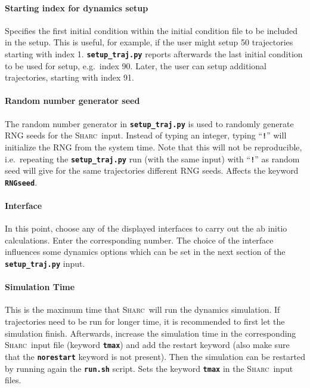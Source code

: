\documentclass[a4paper,11pt,DIV=15,openany,twoside=false]{scrbook}
\newcommand{\sharc}{\textsc{Sharc}}
\newcommand{\ttt}[1]{\textbf{\texttt{#1}}}
\begin{document}
\paragraph{Starting index for dynamics setup}

Specifies the first initial condition within the initial condition file to be included in the setup. This is useful, for example, if the user might setup 50 trajectories starting with index 1. \ttt{setup\_traj.py} reports afterwards the last initial condition to be used for setup, e.g.\ index 90. Later, the user can setup additional trajectories, starting with index 91.

\paragraph{Random number generator seed}

The random number generator in \ttt{setup\_traj.py} is used to randomly generate RNG seeds for the \sharc\ input. Instead of typing an integer, typing ``\ttt{!}'' will initialize the RNG from the system time. Note that this will not be reproducible, i.e.\ repeating the \ttt{setup\_traj.py} run (with the same input) with ``\ttt{!}'' as random seed will give for the same trajectories different RNG seeds. Affects the keyword \ttt{RNGseed}.

\paragraph{Interface}

In this point, choose any of the displayed interfaces to carry out the ab initio calculations. Enter the corresponding number. The choice of the interface influences some dynamics options which can be set in the next section of the \ttt{setup\_traj.py} input.

\paragraph{Simulation Time}

This is the maximum time that \sharc\ will run the dynamics simulation. If trajectories need to be run for longer time, it is recommended to first let the simulation finish. Afterwards, increase the simulation time in the corresponding \sharc\ input file (keyword \ttt{tmax}) and add the restart keyword (also make sure that the \ttt{norestart} keyword is not present). Then the simulation can be restarted by running again the \ttt{run.sh} script. Sets the keyword \ttt{tmax} in the \sharc\ input files.
\end{document}
